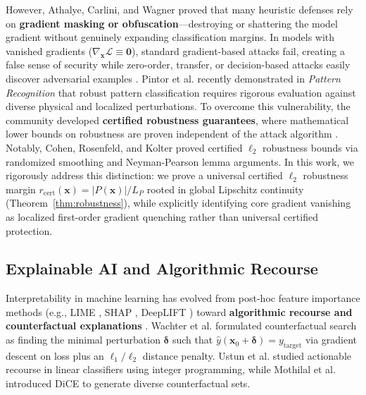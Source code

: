 \documentclass[times, review, 10pt]{elsarticle}
\begin{document}
However, Athalye, Carlini, and Wagner \cite{athalye2018obfuscated} proved that many heuristic defenses rely on \textbf{gradient masking or obfuscation}---destroying or shattering the model gradient without genuinely expanding classification margins. In models with vanished gradients ($\nabla_{\mathbf{x}} \mathcal{L} \equiv \mathbf{0}$), standard gradient-based attacks fail, creating a false sense of security while zero-order, transfer, or decision-based attacks easily discover adversarial examples \cite{croce2020reliable,pintor2023imagenet}. Pintor et al. \cite{pintor2023imagenet} recently demonstrated in \textit{Pattern Recognition} that robust pattern classification requires rigorous evaluation against diverse physical and localized perturbations. To overcome this vulnerability, the community developed \textbf{certified robustness guarantees}, where mathematical lower bounds on robustness are proven independent of the attack algorithm \cite{raghunathan2018certified}. Notably, Cohen, Rosenfeld, and Kolter \cite{cohen2019certified} proved certified $\ell_2$ robustness bounds via randomized smoothing and Neyman-Pearson lemma arguments. In this work, we rigorously address this distinction: we prove a universal certified $\ell_2$ robustness margin $r_{\mathrm{cert}}(\mathbf{x}) = |P(\mathbf{x})|/L_P$ rooted in global Lipschitz continuity (Theorem~\ref{thm:robustness}), while explicitly identifying core gradient vanishing as localized first-order gradient quenching rather than universal certified protection.

\subsection{Explainable AI and Algorithmic Recourse}
Interpretability in machine learning has evolved from post-hoc feature importance methods (e.g., LIME \cite{ribeiro2016why}, SHAP \cite{lundberg2017unified}, DeepLIFT \cite{shrikumar2017learning}) toward \textbf{algorithmic recourse and counterfactual explanations} \cite{wachter2017counterfactual,verma2022counterfactual_tpami,guidotti2018survey}. Wachter et al. \cite{wachter2017counterfactual} formulated counterfactual search as finding the minimal perturbation $\boldsymbol{\delta}$ such that $\hat{y}(\mathbf{x}_0 + \boldsymbol{\delta}) = y_{\mathrm{target}}$ via gradient descent on loss plus an $\ell_1/\ell_2$ distance penalty. Ustun et al. \cite{ustun2019actionable} studied actionable recourse in linear classifiers using integer programming, while Mothilal et al. \cite{mothilal2020explaining} introduced DiCE to generate diverse counterfactual sets.
\end{document}
